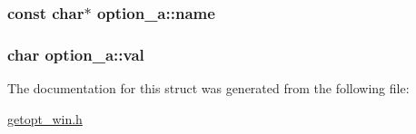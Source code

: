 \subsubsection[{name}]{\setlength{\rightskip}{0pt plus 5cm}const char$\ast$ option\+\_\+a\+::name}\label{structoption__a_a8ed1ffc9accc9b1699171df984a68748}
\hypertarget{structoption__a_aaf0b246fc9e030806918d01bad91a028}{}
\subsubsection[{val}]{\setlength{\rightskip}{0pt plus 5cm}char option\+\_\+a\+::val}\label{structoption__a_aaf0b246fc9e030806918d01bad91a028}


The documentation for this struct was generated from the following file\+:\begin{DoxyCompactItemize}
\item 
\hyperlink{getopt__win_8h}{getopt\+\_\+win.\+h}\end{DoxyCompactItemize}
